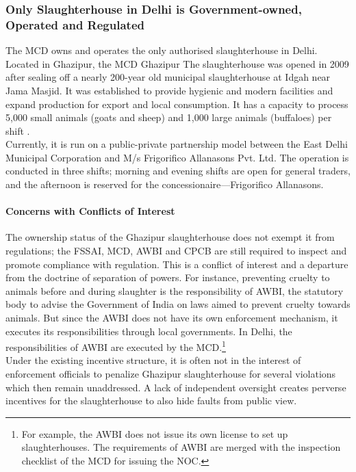 \documentclass[a4paper, 12pt]{article}
\begin{document}
\subsubsection{Only Slaughterhouse in Delhi is Government-owned, Operated and Regulated}

The MCD owns and operates the only authorised slaughterhouse in Delhi. Located in Ghazipur, the MCD Ghazipur The slaughterhouse was opened in 2009 after sealing off a nearly 200-year old municipal slaughterhouse at Idgah near Jama Masjid. It was established to provide hygienic and modern facilities and expand production for export and local consumption. It has a capacity to process 5,000 small animals (goats and sheep) and 1,000 large animals (buffaloes) per shift \parencite{bhardwajnews}.\\

Currently, it is run on a public-private partnership model between the East Delhi Municipal Corporation and M/s Frigorifico Allanasons Pvt. Ltd. The operation is conducted in three shifts; morning and evening shifts are open for general traders, and the afternoon is reserved for the concessionaire—Frigorifico Allanasons.

\paragraph{Concerns with Conflicts of Interest}


The ownership status of the Ghazipur slaughterhouse does not exempt it from regulations; the FSSAI, MCD, AWBI and CPCB are still required to inspect and promote compliance with regulation. This is a conflict of interest and a departure from the doctrine of separation of powers. For instance, preventing cruelty to animals before and during slaughter is the responsibility of AWBI, the statutory body to advise the Government of India on laws aimed to prevent cruelty towards animals. But since the AWBI does not have its own enforcement mechanism, it executes its responsibilities through local governments. In Delhi, the responsibilities of AWBI are executed by the MCD.\footnote{ For example, the AWBI does not issue its own license to set up slaughterhouses. The requirements of AWBI are merged with the inspection checklist of the MCD for issuing the NOC.}\\

Under the existing incentive structure, it is often not in the interest of enforcement officials to penalize Ghazipur slaughterhouse for several violations which then remain unaddressed. A lack of independent oversight creates perverse incentives for the slaughterhouse to also hide faults from public view. \\
\end{document}
